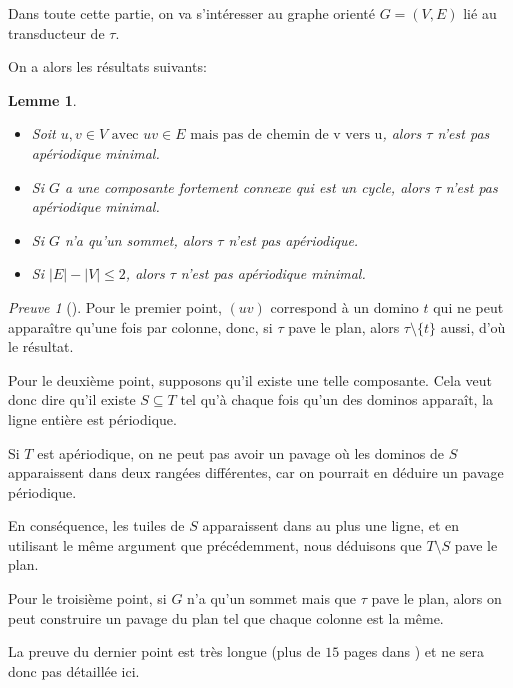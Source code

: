 \documentclass{scrartcl}
\renewcommand{\le}{\leqslant}
\newcommand{\sube}{\subseteq}
\newtheorem{lemme}{Lemme}
\theoremstyle{definition}
\theoremstyle{remark}
\newtheorem*{preuve}{Preuve}
\begin{document}
Dans toute cette partie, on va s'intéresser au graphe orienté $G = (V,E)$ lié au transducteur de $\tau$.

On a alors les résultats suivants:

\begin{lemme}

\begin{itemize}
    \item Soit $u,v \in V \text{ avec } uv \in E \text{ mais pas de chemin de v vers u}$, alors $\tau$ n'est pas apériodique minimal.
    \item Si $G$ a une composante fortement connexe qui est un cycle, alors $\tau$ n'est pas apériodique minimal.
    \item Si $G$ n'a qu'un sommet, alors $\tau$ n'est pas apériodique.
    \item Si $|E|-|V| \le 2$, alors $\tau$ n'est pas apériodique minimal.
\end{itemize}


\end{lemme}

\begin{preuve}[]
    
Pour le premier point, $(uv)$ correspond à un domino $t$ qui ne peut apparaître qu'une fois par colonne,
donc, si $\tau$ pave le plan, alors $\tau \setminus \{t \}$ aussi, d'où le résultat.

\;

Pour le deuxième point, supposons qu'il existe une telle composante. Cela veut donc dire qu'il existe $S \sube T$
tel qu'à chaque fois qu'un des dominos apparaît, la ligne entière est périodique.

Si $T$ est apériodique, on ne peut pas avoir un pavage où les dominos de $S$ apparaissent dans deux rangées différentes, car on pourrait en déduire un pavage périodique.

En conséquence, les tuiles de $S$ apparaissent dans au plus une ligne, et en utilisant le même argument que précédemment, nous déduisons que $T \setminus S$ pave le plan.

\;

Pour le troisième point, si $G$ n'a qu'un sommet mais que $\tau$ pave le plan, alors on peut construire un pavage
du plan tel que chaque colonne est la même.

\;

La preuve du dernier point est très longue (plus de $15$ pages dans \cite{algo}) et ne sera donc pas détaillée ici.

\end{preuve}
\end{document}

